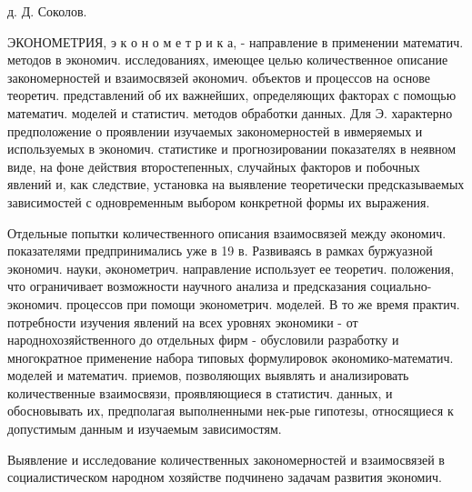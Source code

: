 \documentclass[10pt]{article}
\begin{document}
д. Д. Соколов.



ЭКОНОМЕТРИЯ, э к о н о м е т р и к а, - направление в применении математич. методов в экономич. исследованиях, имеющее целью количественное описание закономерностей и взаимосвязей әкономич. объектов и процессов на основе теоретич. представлений об их важнейших, определяющих факторах с помощью математич. моделей и статистич. методов обработки данных. Для Э. характерно предположение о проявлении изучаемых закономерностей в ивмеряемых и используемых в экономич. статистике и прогнозировании показателях в неявном виде, на фоне действия второстепенных, случайных факторов и побочных явлений и, как следствие, установка на выявление теоретически предсказываемых зависимостей с одновременным выбором конкретной формы их выражения.



Отдельные попытки количественного описания взаимосвязей между әкономич. показателями предпринимались уже в 19 в. Развиваясь в рамках буржуазной экономич. науки, әконометрич. направление использует ее теоретич. положения, что ограничивает возможности научного анализа и предсказания социально-экономич. процессов при помощи эконометрич. моделей. В то же время практич. потребности изучения явлений на всех уровнях экономики - от народнохозяйственного до отдельных фирм - обусловили разработку и многократное применение набора типовых формулировок әкономико-математич. моделей и математич. приемов, позволяющих выявлять и анализировать количественные взаимосвязи, проявляющиеся в статистич. данных, и обосновывать их, предполагая выполненными нек-рые гипотезы, относящиеся к допустимым данным и изучаемым зависимостям.



Выявление и исследование количественных закономерностей и взаимосвязей в социалистическом народном хозяӥстве подчинено задачам развития экономич.
\end{document}
